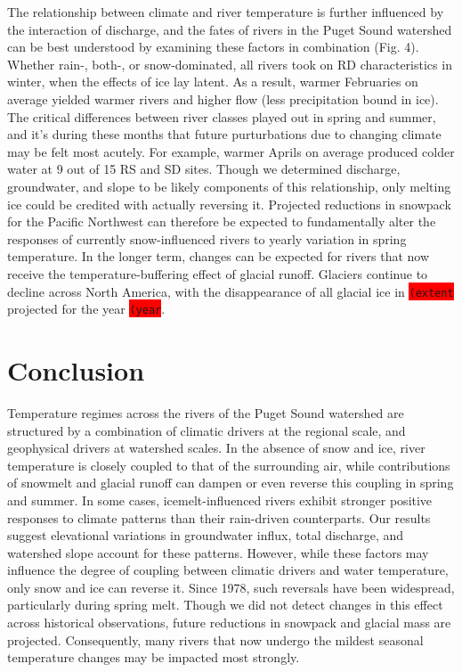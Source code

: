 \documentclass{article}
\begin{document}
The relationship between climate and river temperature is further influenced by the interaction of discharge, and the fates of rivers in the Puget Sound watershed can be best understood by examining these factors in combination (Fig. 4). Whether rain-, both-, or snow-dominated, all rivers took on RD characteristics in winter, when the effects of ice lay latent. As a result, warmer Februaries on average yielded warmer rivers and higher flow (less precipitation bound in ice). The critical differences between river classes played out in spring and summer, and it's during these months that future purturbations due to changing climate may be felt most acutely. For example, warmer Aprils on average produced colder water at 9 out of 15 RS and SD sites. Though we determined discharge, groundwater, and slope to be likely components of this relationship, only melting ice could be credited with actually reversing it. Projected reductions in snowpack for the Pacific Northwest can therefore be expected to fundamentally alter the responses of currently snow-influenced rivers to yearly variation in spring temperature. In the longer term, changes can be expected for rivers that now receive the temperature-buffering effect of glacial runoff. Glaciers continue to decline across North America, with the disappearance of all glacial ice in \colorbox{red}{\lstinline{(extent}} projected for the year \colorbox{red}{\lstinline{(year}}.

\section*{Conclusion}

Temperature regimes across the rivers of the Puget Sound watershed are structured by a combination of climatic drivers at the regional scale, and geophysical drivers at watershed scales. In the absence of snow and ice, river temperature is closely coupled to that of the surrounding air, while contributions of snowmelt and glacial runoff can dampen or even reverse this coupling in spring and summer. In some cases, icemelt-influenced rivers exhibit stronger positive responses to climate patterns than their rain-driven counterparts. Our results suggest elevational variations in groundwater influx, total discharge, and watershed slope account for these patterns. However, while these factors may influence the degree of coupling between climatic drivers and water temperature, only snow and ice can reverse it. Since 1978, such reversals have been widespread, particularly during spring melt. Though we did not detect changes in this effect across historical observations, future reductions in snowpack and glacial mass are projected. Consequently, many rivers that now undergo the mildest seasonal temperature changes may be impacted most strongly.
\end{document}
